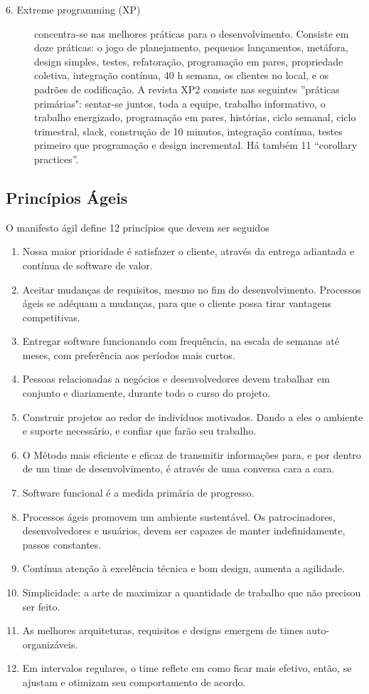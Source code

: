 \begin{description}
\item [6. Extreme programming (XP)]
concentra-se nas melhores práticas para o desenvolvimento.  Consiste em doze práticas: o jogo de planejamento, pequenos lançamentos,  metáfora, design simples, testes, refatoração, programação em pares,  propriedade coletiva, integração contínua, 40 h semana, os clientes no local,  e os padrões de codificação. A revista XP2 consiste nas seguintes  ''práticas primárias": sentar-se juntos, toda a equipe, trabalho informativo,  o trabalho energizado, programação em pares, histórias, ciclo semanal,  ciclo trimestral, slack, construção de 10 minutos, integração contínua,  testes primeiro que programação e design incremental.  Há também 11 ``corollary practices''.
\end{description}

\subsection{Princípios Ágeis}
\label{principios-ageis}
O manifesto ágil define 12 princípios que devem ser seguidos~\cite{manifesto2013}
%
\begin{enumerate}
\item Nossa maior prioridade é satisfazer o cliente, através da entrega adiantada e contínua de software de valor.
\item Aceitar mudanças de requisitos, mesmo no fim do desenvolvimento. Processos ágeis se adéquam a mudanças, para que o cliente possa tirar vantagens competitivas.
\item Entregar software funcionando com frequência, na escala de semanas até meses, com preferência aos períodos mais curtos.
\item Pessoas relacionadas a negócios e desenvolvedores devem trabalhar em conjunto e diariamente, durante todo o curso do projeto.
\item Construir projetos ao redor de indivíduos motivados. Dando a eles o ambiente e suporte necessário, e confiar que farão seu trabalho.
\item O Método mais eficiente e eficaz de transmitir informações para, e por dentro de um time de desenvolvimento, é através de uma conversa cara a cara.
\item Software funcional é a medida primária de progresso.
\item Processos ágeis promovem um ambiente sustentável. Os patrocinadores, desenvolvedores e usuários, devem ser capazes de manter indefinidamente, passos constantes.
\item Contínua atenção à excelência técnica e bom design, aumenta a agilidade.
\item Simplicidade: a arte de maximizar a quantidade de trabalho que não precisou ser feito.
\item As melhores arquiteturas, requisitos e designs emergem de times auto-organizáveis.
\item Em intervalos regulares, o time reflete em como ficar mais efetivo, então, se ajustam e otimizam seu comportamento de acordo.
\end{enumerate}


